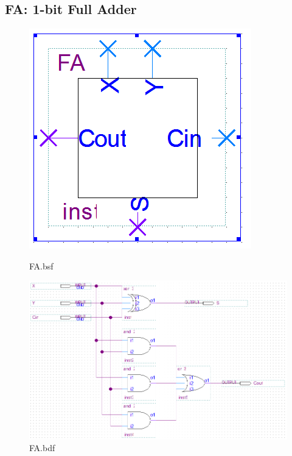 \documentclass[12pt,a4paper]{article}
\begin{document}
  \subsection{FA: 1-bit Full Adder}
  \begin{figure}[H]
    \centering
    \begin{subcaptionblock}{0.15\linewidth}
      \includegraphics[width=\linewidth]{Lab2_2/FA_bsf.png}
      \caption{FA.bsf}
    \end{subcaptionblock}
    \begin{subcaptionblock}{0.84\linewidth}
      \includegraphics[width=\linewidth]{Lab2_2/FA_bdf.png}
      \caption{FA.bdf}
    \end{subcaptionblock}
  \end{figure}
\end{document}
